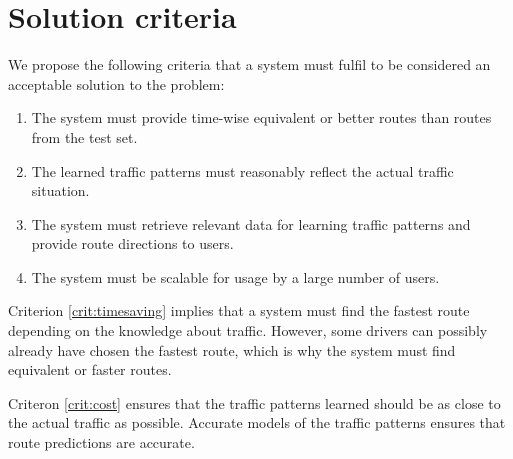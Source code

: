 \section{Solution criteria}\label{chap:solutioncriteria}
We propose the following criteria that a system must fulfil to be considered an acceptable solution to the problem:

\begin{enumerate}
	\item The system must provide time-wise equivalent or better routes than routes from the test set.\label{crit:timesaving}
	\item The learned traffic patterns must reasonably reflect the actual traffic situation.\label{crit:cost}
	\item The system must retrieve relevant data for learning traffic patterns and provide route directions to users.\label{crit:sendmessages}
	\item The system must be scalable for usage by a large number of users. \label{crit:severalconnections}
\end{enumerate}
Criterion \ref{crit:timesaving} implies that a system must find the fastest route depending on the knowledge about traffic. However, some drivers can possibly already have chosen the fastest route, which is why the system must find equivalent or faster routes.

Criteron \ref{crit:cost} ensures that the traffic patterns learned should be as close to the actual traffic as possible. Accurate models of the traffic patterns ensures that route predictions are accurate. 


